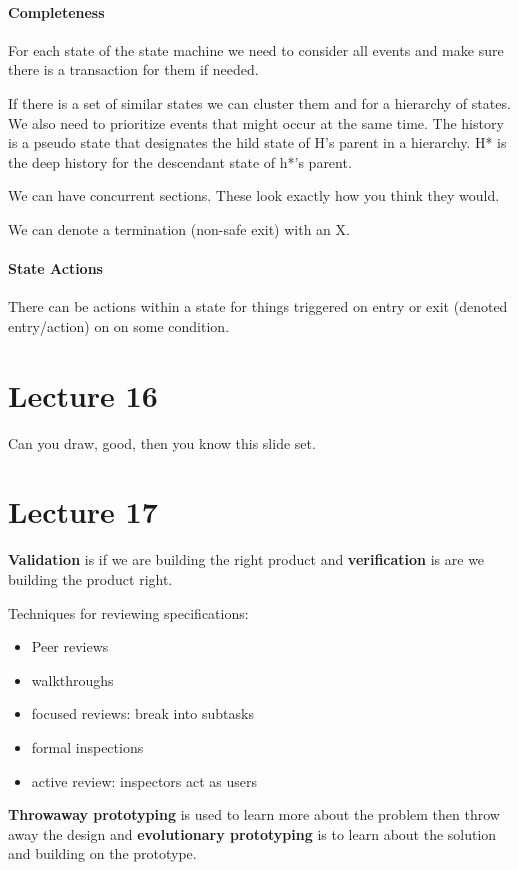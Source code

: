\documentclass[12pt]{article}
\begin{document}
\paragraph{Completeness} 
\label{par:completeness}
For each state of the state machine we need to consider all events and make sure there is a transaction for them if needed. 


If there is a set of similar states we can cluster them and for a hierarchy of states. We also need to prioritize events that might occur at the same time. The history is a pseudo state that designates the hild state of H's parent in a hierarchy. H* is the deep history for the descendant state of h*'s parent. 

We can have concurrent sections. These look exactly how you think they would.

We can denote a termination (non-safe exit) with an X.

\paragraph{State Actions} 
\label{par:state_actions}
There can be actions within a state for things triggered on entry or exit (denoted entry/action) on on some condition.

\section*{Lecture 16}
\label{sec:lecture_16}
Can you draw, good, then you know this slide set.

\section*{Lecture 17}
\label{sec:lecture_17}
\textbf{Validation} is if we are building the right product and \textbf{verification} is are we building the product right.

Techniques for reviewing specifications:
\begin{itemize}
	\item Peer reviews
	\item walkthroughs
	\item focused reviews: break into subtasks
	\item formal inspections
	\item active review: inspectors act as users
\end{itemize}

\textbf{Throwaway prototyping} is used to learn more about the problem then throw away the design and \textbf{evolutionary prototyping} is to learn about the solution and building on the prototype.
\end{document}
